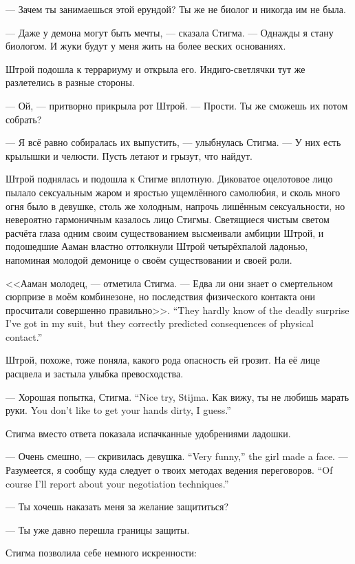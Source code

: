 --- Зачем ты занимаешься этой ерундой?
Ты же не биолог и никогда им не была.

--- Даже у демона могут быть мечты, --- сказала Стигма.
--- Однажды я стану биологом.
И жуки будут у меня жить на более веских основаниях.

Штрой подошла к террариуму и открыла его.
Индиго-светлячки тут же разлетелись в разные стороны.

--- Ой, --- притворно прикрыла рот Штрой.
--- Прости.
Ты же сможешь их потом собрать?

--- Я всё равно собиралась их выпустить, --- улыбнулась Стигма.
--- У них есть крылышки и челюсти.
Пусть летают и грызут, что найдут.

\textspace

Штрой поднялась и подошла к Стигме вплотную.
Диковатое оцелотовое лицо пылало сексуальным жаром и яростью ущемлённого самолюбия, и сколь много огня было в девушке, столь же холодным, напрочь лишённым сексуальности, но невероятно гармоничным казалось лицо Стигмы.
Светящиеся чистым светом расчёта глаза одним своим существованием высмеивали амбиции Штрой, и подошедшие Ааман властно оттолкнули Штрой четырёхпалой ладонью, напоминая молодой демонице о своём существовании и своей роли.

<<Ааман молодец, --- отметила Стигма.
{--- Едва ли они знает о смертельном сюрпризе в моём комбинезоне, но последствия физического контакта они просчитали совершенно правильно>>.}
{``They hardly know of the deadly surprise I've got in my suit, but they correctly predicted consequences of physical contact.''}

Штрой, похоже, тоже поняла, какого рода опасность ей грозит.
На её лице расцвела и застыла улыбка превосходства.

{--- Хорошая попытка, Стигма.}
{``Nice try, Stijma.}
{Как вижу, ты не любишь марать руки.}
{You don't like to get your hands dirty, I guess.''}

Стигма вместо ответа показала испачканные удобрениями ладошки.

{--- Очень смешно, --- скривилась девушка.}
{``Very funny,'' the girl made a face.}
{--- Разумеется, я сообщу куда следует о твоих методах ведения переговоров.}
{``Of course I'll report about your negotiation techniques.''}

--- Ты хочешь наказать меня за желание защититься?

--- Ты уже давно перешла границы защиты.

Стигма позволила себе немного искренности:

